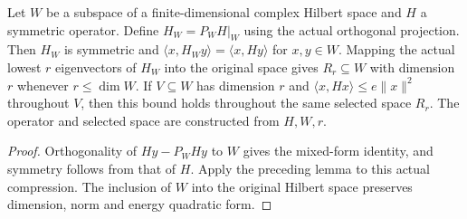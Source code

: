 \begin{lemma}
    \label{lem:ritz_actual_compression}
    \leanok
    Let $W$ be a subspace of a finite-dimensional complex Hilbert space
    and $H$ a symmetric operator. Define $H_W=P_WH|_W$ using the actual
    orthogonal projection. Then $H_W$ is symmetric and
    $\langle x,H_Wy\rangle=\langle x,Hy\rangle$ for $x,y\in W$.
    Mapping the actual lowest $r$ eigenvectors of $H_W$ into the original
    space gives $R_r\subseteq W$ with dimension $r$ whenever $r\le\dim W$.
    If $V\subseteq W$ has dimension $r$ and
    $\langle x,Hx\rangle\le e\|x\|^2$ throughout $V$, then this bound
    holds throughout the same selected space $R_r$.
    The operator and selected space are constructed from $H,W,r$.
\end{lemma}
\begin{proof}\leanok
    Orthogonality of $H y-P_WH y$ to $W$ gives the mixed-form identity,
    and symmetry follows from that of $H$. Apply the preceding lemma
    to this actual compression. The inclusion of $W$ into the original
    Hilbert space preserves dimension, norm and energy quadratic form.
\end{proof}

